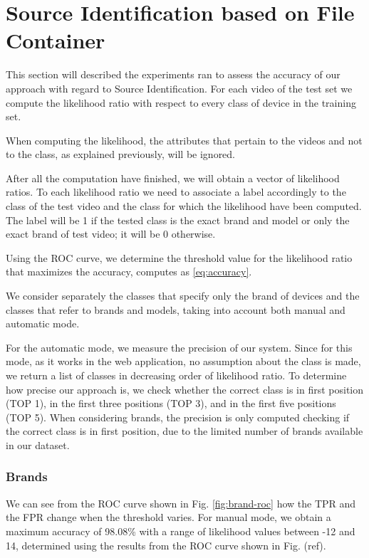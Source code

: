 \section{Source Identification based on File Container}

This section will described the experiments ran to assess the accuracy of our approach with regard to Source Identification. For each video of the test set we compute the likelihood ratio with respect to every class of device in the training set. 

When computing the likelihood, the attributes that pertain to the videos and not to the class, as explained previously, will be ignored.

After all the computation have finished, we will obtain a vector of likelihood ratios. To each likelihood ratio we need to associate a label accordingly to the class of the test video and the class for which the likelihood have been computed. The label will be 1 if the tested class is the exact brand and model or only the exact brand of test video; it will be 0 otherwise.

Using the ROC curve, we determine the threshold value for the likelihood ratio that maximizes the accuracy, computes as \ref{eq:accuracy}.

We consider separately the classes that specify only the brand of devices and the classes that refer to brands and models, taking into account both manual and automatic mode.

For the automatic mode, we measure the precision of our system. Since for this mode, as it works in the web application, no assumption about the class is made, we return a list of classes in decreasing order of likelihood ratio. To determine how precise our approach is, we check whether the correct class is in first position (TOP 1), in the first three positions (TOP 3), and in the first five positions (TOP 5). When considering brands, the precision is only computed checking if the correct class is in first position, due to the limited number of brands available in our dataset.

\subsubsection*{Brands}

We can see from the ROC curve shown in Fig. \ref{fig:brand-roc} how the TPR and the FPR change when the threshold varies.
For manual mode, we obtain a maximum accuracy of 98.08\% with a range of likelihood values between -12 and 14, determined using the results from the ROC curve shown in Fig. (ref).

